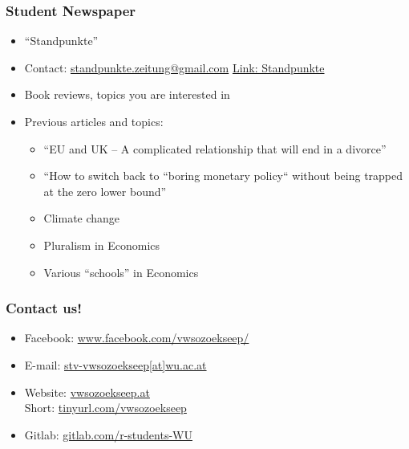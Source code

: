 \documentclass{beamer}
\begin{document}
\begin{frame}
  \frametitle{Student Newspaper}
  \begin{itemize}
  \item ``Standpunkte''
  \item Contact: \href{mailto:standpunkte.zeitung@gmail.com}{standpunkte.zeitung@gmail.com}
    \href{https://www.wu.ac.at/economics/vw-zentrum/standpunkte/}{Link: Standpunkte}
  \item Book reviews, topics you are interested in
  \item Previous articles and topics:
    \begin{itemize}
    \item ``EU and UK – A complicated relationship that will end in a divorce''
    \item ``How to switch back to “boring monetary policy“ without being trapped at the zero lower bound''
    \item Climate change
    \item Pluralism in Economics
    \item Various ``schools'' in Economics
    \end{itemize}
  \end{itemize}
\end{frame}
\begin{frame}
  \frametitle{Contact us!}
  \begin{itemize}
  \item Facebook: \href{https://www.facebook.com/vwsozoekseep/}{www.facebook.com/vwsozoekseep/}
  \item E-mail: \href{mailto:stv-vwsozoekseep@wu.ac.at}{stv-vwsozoekseep[at]wu.ac.at}
  \item Website: \href{http://vwsozoekseep.at/}{vwsozoekseep.at} \\
    Short: \href{https://tinyurl.com/vwsozoekseep}{tinyurl.com/vwsozoekseep}
  \item Gitlab: \href{https://gitlab.com/r-students-WU}{gitlab.com/r-students-WU}
  \end{itemize}
\end{frame}
\end{document}
